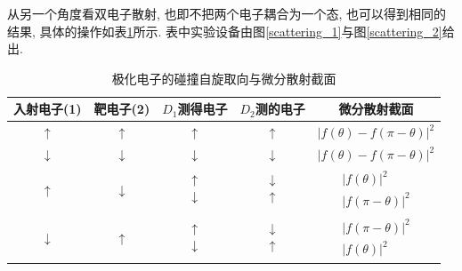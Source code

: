 \documentclass[a4paper, 11pt]{article}
\begin{document}
\begin{spacing}{1.2}
          从另一个角度看双电子散射, 也即不把两个电子耦合为一个态, 也可以得到相同的结果, 具体的操作如表\ref{2ele_table}所示. 
          表中实验设备由图\ref{scattering_1}与图\ref{scattering_2}给出. 

          \begin{table}
            \centering
            \begin{spacing}{1.4}
            \caption{极化电子的碰撞自旋取向与微分散射截面}
            \label{2ele_table}
            \begin{tabular}{ccccc}
              \toprule
              入射电子(1)  &  靶电子(2) & $D_1$测得电子 & $D_2$测的电子 & 微分散射截面\\
              \hline
              $\uparrow$ & $\uparrow$ & $\uparrow$ & $\uparrow$ & $|f(\theta)-f(\pi-\theta)|^2$\\
              \hline
              $\downarrow$ & $\downarrow$ & $\downarrow$ & $\downarrow$ & $|f(\theta)-f(\pi-\theta)|^2$\\
              \hline
              $\uparrow$ & $\downarrow$ & $\begin{array}{l}\uparrow\\ \downarrow\end{array}$%
              &$\begin{array}{l}\downarrow\\\uparrow\end{array}$%
              &$\begin{array}{l}|f(\theta)|^2 \\|f(\pi-\theta)|^2 \end{array}$\\
              \hline
              $\downarrow$ & $\uparrow$ & $\begin{array}{l}\uparrow \\ \downarrow\end{array}$%
              &$\begin{array}{l}\downarrow\\\uparrow\end{array}$%
              &$\begin{array}{l}|f(\pi-\theta)|^2 \\|f(\theta)|^2 \end{array}$\\ 
              \bottomrule 
            \end{tabular} 
            \end{spacing}
          \end{table}


\end{spacing}
\end{document}
